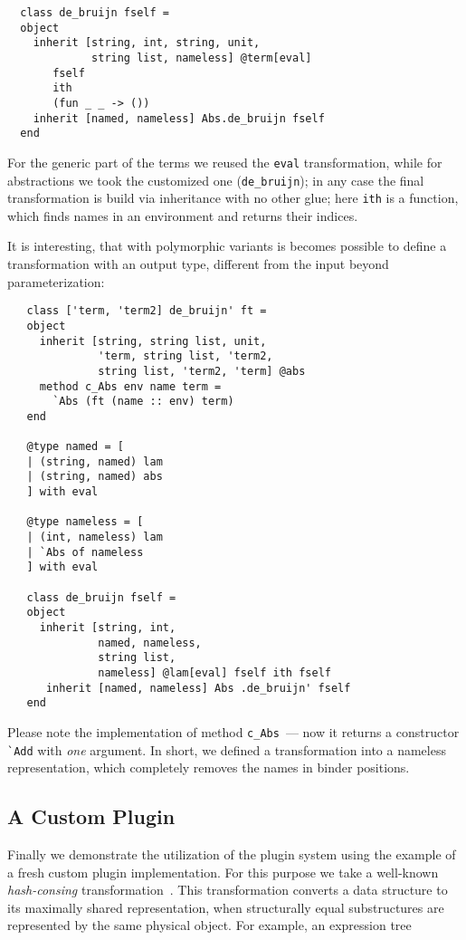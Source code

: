 \begin{lstlisting}
  class de_bruijn fself =
  object
    inherit [string, int, string, unit,
             string list, nameless] @term[eval]
       fself
       ith
       (fun _ _ -> ())
    inherit [named, nameless] Abs.de_bruijn fself
  end
\end{lstlisting}

For the generic part of the terms we reused the \lstinline{eval} transformation, while for abstractions we took the customized one (\lstinline{de_bruijn}); in
any case the final transformation is build via inheritance with no other glue; here \lstinline{ith} is a function, which finds names in an
environment and returns their indices.

It is interesting, that with polymorphic variants is becomes possible to define a transformation with an output type, different from the input
beyond parameterization:

\begin{lstlisting}
   class ['term, 'term2] de_bruijn' ft =
   object
     inherit [string, string list, unit,
              'term, string list, 'term2,
              string list, 'term2, 'term] @abs
     method c_Abs env name term =
       `Abs (ft (name :: env) term) 
   end
     
   @type named = [
   | (string, named) lam
   | (string, named) abs
   ] with eval
                     
   @type nameless = [
   | (int, nameless) lam
   | `Abs of nameless
   ] with eval

   class de_bruijn fself =
   object
     inherit [string, int,
              named, nameless,
              string list,
              nameless] @lam[eval] fself ith fself
      inherit [named, nameless] Abs .de_bruijn' fself 
   end
\end{lstlisting}

Please note the implementation of method \lstinline{c_Abs}~--- now it returns a constructor \lstinline{`Add} with \emph{one}
argument. In short, we defined a transformation into a nameless representation, which completely removes the names in binder
positions.

\subsection{A Custom Plugin}
\label{pluginExample}

Finally we demonstrate the utilization of the plugin system using the example of a fresh custom plugin implementation. For this purpose we
take a well-known \emph{hash-consing} transformation~\cite{HC}. This transformation converts a data structure to its maximally shared
representation, when structurally equal substructures are represented by the same physical object. For example, an expression tree

